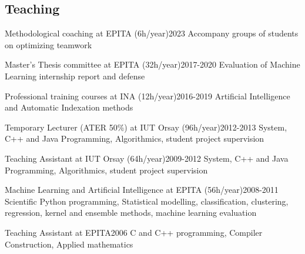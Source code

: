 \begin{en}
\subsection{Teaching}

\begin{jobshort}{Methodological coaching at EPITA (6h/year)}{2023}
Accompany groups of students on optimizing teamwork
\end{jobshort}

\begin{jobshort}{Master's Thesis committee at EPITA (32h/year)}{2017-2020}
Evaluation of Machine Learning internship report and defense
\end{jobshort}

\begin{jobshort}{Professional training courses at INA (12h/year)}{2016-2019}
Artificial Intelligence and Automatic Indexation methods
\end{jobshort}

\begin{jobshort}{Temporary Lecturer (ATER 50\%) at IUT Orsay (96h/year)}{2012-2013}
System, C++ and Java Programming, Algorithmics, student project supervision
\end{jobshort}

\begin{jobshort}{Teaching Assistant at IUT Orsay (64h/year)}{2009-2012}
System, C++ and Java Programming, Algorithmics, student project supervision
\end{jobshort}

\begin{jobshort}{Machine Learning and Artificial Intelligence at EPITA (56h/year)}{2008-2011}
Scientific Python programming, Statistical modelling, classification, clustering, regression, kernel and ensemble methods, machine learning evaluation
\end{jobshort}

\begin{jobshort}{Teaching Assistant at EPITA}{2006}
C and C++ programming, Compiler Construction, Applied mathematics
\end{jobshort}

\end{en}


